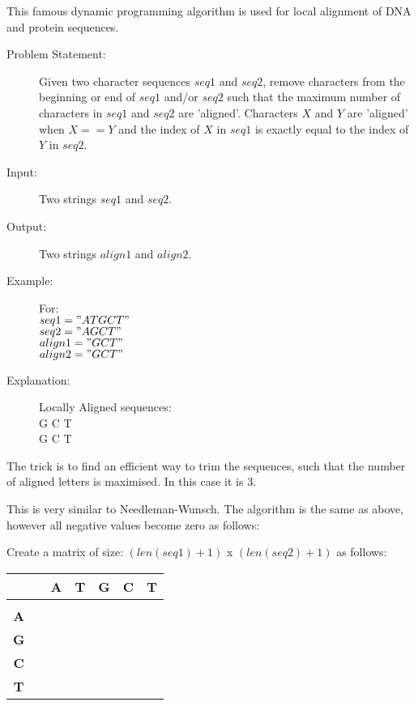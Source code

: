 This famous dynamic programming algorithm is used for local alignment of DNA and protein sequences.

\begin{description}
    
    \item[Problem Statement:]
        Given two character sequences $seq1$ and $seq2$,
        remove characters from the beginning or end of $seq1$ and/or $seq2$ such that the maximum number of characters in $seq1$ and $seq2$ are 'aligned'.
        Characters $X$ and $Y$ are 'aligned' when $X == Y$ and the index of $X$ in $seq1$ is exactly equal to the index of $Y$ in $seq2$.
        
    \item[Input:] 
        Two strings $seq1$ and $seq2$.
        
    \item[Output:]
        Two strings $align1$ and $align2$.
        
    \item[Example:] For:\\
        $seq1 = "ATGCT"$\\
        $seq2 = "AGCT"$\\
        $align1 = "GCT"$\\
        $align2 = "GCT"$

    \item[Explanation:]
        Locally Aligned sequences:\\
        G C T\\
        G C T
\end{description}

The trick is to find an efficient way to trim the sequences, such that the number of aligned letters is maximised. In this case it is 3.

This is very similar to Needleman-Wunsch. The algorithm is the same as above, however all negative values become zero as follows:

Create a matrix of size: $(len(seq1) + 1)$ x $(len(seq2) + 1)$ as follows:

\begin{table}[htbp]
    \centering
    \begin{tabular}{|c|c|c|c|c|c|c|}
        \hline
          &  & \textbf{A} & \textbf{T} & \textbf{G} & \textbf{C} & \textbf{T} \\
        \hline
         &  &  &  &  &  &  \\
        \hline
        \textbf{A} &  &  &  &  &  &  \\
        \hline
        \textbf{G} &  &  &  &  &  &  \\
        \hline
        \textbf{C} &  &  &  &  &  &  \\
        \hline
        \textbf{T} &  &  &  &  &  &  \\
        \hline
    \end{tabular}
\end{table}


